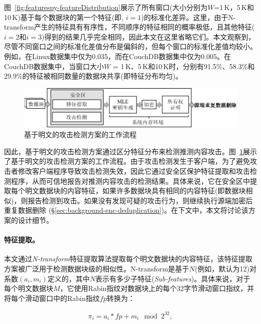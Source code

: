 图~\ref{fig:featurespy-featureDistribution}展示了所有窗口(大小分别为$W$=1\,K，5\,K和10\,K)基于每个数据块的第一个特征(即, $i = 1$)的标准化差异。这里，由于N-transform产生的特征具有有序性，不同顺序的特征相同的概率极低，且其他特征($i = 2$和$i = 3$)得到的结果几乎完全相同，因此本文在这里省略它们。本文观察到，尽管不同窗口之间的标准化差值分布是偏斜的，但每个窗口的标准化差值均较小。例如，在Linux数据集中仅为0.035，而在CouchDB数据集中仅为0.005。在CouchDB数据集中，当窗口大小$W$ = 1\,K、5\,K和10\,K时，分别有91.5\%、58.3\%和29.9\%的特征被相同数量的数据块共享(即特征分布均匀)。

\begin{figure}[!htb]
  \centering
  \includegraphics[width=\textwidth]{pic/featurespy/naive.pdf}
  \caption{基于明文的攻击检测方案的工作流程}
  \label{fig:featurespy-architecture-strawman}
\end{figure}

因此，基于明文的攻击检测方案通过区分特征分布来检测推测内容攻击。图~\ref{fig:featurespy-architecture-strawman}展示了基于明文的攻击检测方案的工作流程。由于攻击检测发生于客户端，为了避免攻击者修改客户端程序导致攻击检测失效，因此它通过安全区保护特征提取和攻击检测程序，从而可信地报告对推测内容攻击的检测结果。具体来说，它在安全区中提取每个明文数据块的内容特征，如果许多数据块具有相同的内容特征(即数据块相似)，则报告检测到攻击。如果没有发现可疑的攻击行为，则继续执行源端加密后重复数据删除 (\S\ref{sec:background-enc-deduplication})。在下文中，本文将讨论该方案的设计细节。

\paragraph*{特征提取。}
本文通过\textit{N-transform}特征提取算法提取每个明文数据块的内容特征，该特征提取方案被广泛用于检测数据块级的相似性。N-transform是基于$N$(例如，默认为12)对系数$(a_i, m_i)$定义的，其中$N$表示有多少子特征(\textit{Sub-features})。具体来说，对于每个明文数据块$M$，它使用Rabin指纹对数据块上的每个32字节滑动窗口指纹，并将每个滑动窗口中的Rabin指纹$fp$转换为：

\begin{eqnarray}
  \label{eq:featurespy-feature}
  \pi_i = a_i * fp + m_i \mod 2^{32},
\end{eqnarray}

